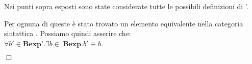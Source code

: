 {\begin{enumerate}[label=(\alph*)]
\begin{itemize}
  \end{itemize}
\end{enumerate}

Nei punti sopra esposti sono state considerate tutte le possibili definizioni
di \bexp'.

Per ognuna di queste è stato trovato un elemento equivalente nella
categoria sintattica \bexp. Possiamo quindi asserire che: \\

$\forall b' \in \textbf{Bexp'}.\exists b \in \ \textbf{Bexp}.b' \equiv b$.

\begin{flushright}
$\Box$
\end{flushright}
}
